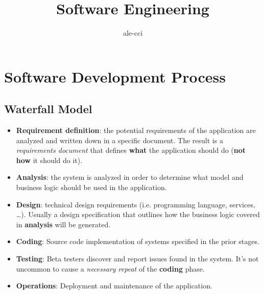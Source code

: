 \documentclass{article}
\title{Software Engineering}
\author{ale-cci}
\begin{document}
\maketitle
\section{Software Development Process}

\subsection{Waterfall Model}


\begin{itemize}
    \item \textbf{Requirement definition}: the potential requirements of the application are analyzed and written down in a specific document.
        The result is a \textit{requirements document} that defines \textbf{what} the application should do (\textbf{not how} it should do it).

    \item \textbf{Analysis}: the system is analyzed in order to determine what model and business logic should be used in the application.

    \item \textbf{Design}: technical design requirements (i.e. programming language, services, \ldots).
        Usually a design specification that outlines how the business logic covered in \textbf{analysis} will be generated.

    \item \textbf{Coding}: Source code implementation of systems specified in the prior stages.
    \item \textbf{Testing}: Beta testers discover and report issues found in the system. It's not uncommon to cause a \textit{necessary repeat} of the \textbf{coding} phase.
    \item \textbf{Operations}: Deployment and maintenance of the application.
\end{itemize}
\end{document}
